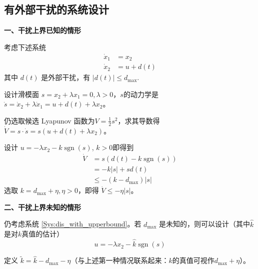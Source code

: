 \subsection{有外部干扰的系统设计}\label{5C_disturbance}
\noindent\textbf{一、干扰上界已知的情形}

\enlargethispage{1em}
考虑下述系统
 \begin{equation}
      \begin{aligned}
    \dot{x}_1 & = x_2\\
    \dot{x}_2 & = u + d (t)
  \end{aligned}\label{Sys:dis_with_upperbound}
 \end{equation}
  其中 $d (t)$ 是外部干扰，有 $| d (t) | \leq d_{\max}$.
  
  设计滑模面 $s = x_2 + \lambda x_1=0, \lambda > 0$，$s$的动力学是 $\dot{s} = \dot{x}_2 + \lambda \dot{x}_1 = u + d (t)
  + \lambda x_2$。
  
  仍选取候选 Lyapunov 函数为$V = \frac{1}{2} s^2$，求其导数得 $\dot{V} = s \cdot \dot{s} = s (u + d (t) + \lambda x_2)$。
  
  设计 $u = - \lambda x_2 - k  \ensuremath{\operatorname{sgn}} (s)$, $k >
  0$即得到
  \begin{align*}
    \dot{V} & = s (d (t) - k  \ensuremath{\operatorname{sgn}} (s))\\
    & = - k  | s | + s  d (t)\\
    & \leq - (k - d_{\max})  | s |
  \end{align*}
  选取 $k = d_{\max} + \eta, \eta > 0$，即得 $\dot{V} \leq - \eta | s |$。

\noindent\textbf{二、干扰上界未知的情形}

  仍考虑系统 \eqref{Sys:dis_with_upperbound}。若 $d_{\max}$ 是未知的，则可以设计（其中$\hat{k}$是对$k$真值的估计）
  \[ u = - \lambda x_2 - \hat{k} \ensuremath{\operatorname{sgn}} (s) \]
  
  定义 $\tilde{k} = \hat{k} - d_{\max} - \eta$（与上述第一种情况联系起来：$k$的真值可视作$d_{\max}+\eta$）。
  

